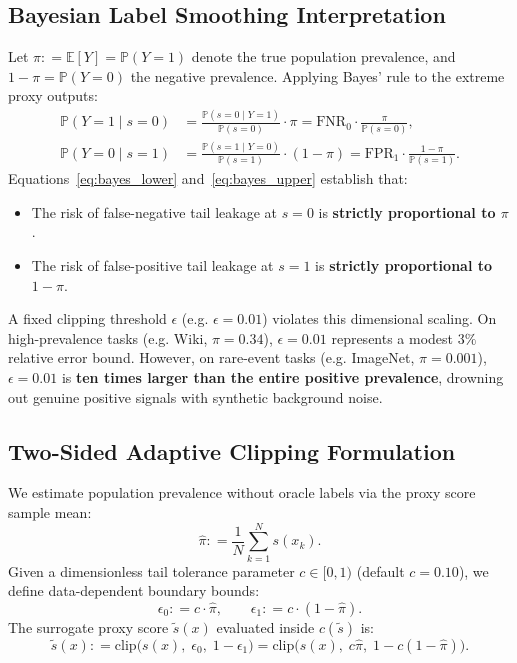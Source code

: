 \documentclass[11pt,a4paper]{article}
\newcommand{\coloneqq}{\mathrel{\mathop:}=}
\newcommand{\E}{\mathbb{E}}
\begin{document}
\subsection{Bayesian Label Smoothing Interpretation}
Let $\pi \coloneqq \E[Y] = \mathbb{P}(Y=1)$ denote the true population prevalence, and $1 - \pi = \mathbb{P}(Y=0)$ the negative prevalence.
Applying Bayes' rule to the extreme proxy outputs:
\begin{align}
\mathbb{P}(Y=1 \mid s=0) &= \frac{\mathbb{P}(s=0 \mid Y=1)}{\mathbb{P}(s=0)} \cdot \pi = \text{FNR}_0 \cdot \frac{\pi}{\mathbb{P}(s=0)}, \label{eq:bayes_lower} \\
\mathbb{P}(Y=0 \mid s=1) &= \frac{\mathbb{P}(s=1 \mid Y=0)}{\mathbb{P}(s=1)} \cdot (1 - \pi) = \text{FPR}_1 \cdot \frac{1 - \pi}{\mathbb{P}(s=1)}. \label{eq:bayes_upper}
\end{align}
Equations~\eqref{eq:bayes_lower} and~\eqref{eq:bayes_upper} establish that:
\begin{itemize}[leftmargin=*]
    \item The risk of false-negative tail leakage at $s=0$ is \textbf{strictly proportional to $\pi$}.
    \item The risk of false-positive tail leakage at $s=1$ is \textbf{strictly proportional to $1 - \pi$}.
\end{itemize}

A fixed clipping threshold $\epsilon$ (e.g. $\epsilon = 0.01$) violates this dimensional scaling. On high-prevalence tasks (e.g. Wiki, $\pi = 0.34$), $\epsilon = 0.01$ represents a modest $3\%$ relative error bound. However, on rare-event tasks (e.g. ImageNet, $\pi = 0.001$), $\epsilon = 0.01$ is \textbf{ten times larger than the entire positive prevalence}, drowning out genuine positive signals with synthetic background noise.

\subsection{Two-Sided Adaptive Clipping Formulation}
We estimate population prevalence without oracle labels via the proxy score sample mean:
\begin{equation}
\hat{\pi} \coloneqq \frac{1}{N}\sum_{k=1}^N s(x_k).
\end{equation}
Given a dimensionless tail tolerance parameter $c \in [0, 1)$ (default $c = 0.10$), we define data-dependent boundary bounds:
\begin{equation}\label{eq:adaptive_bounds}
\epsilon_0 \coloneqq c \cdot \hat{\pi}, \qquad \epsilon_1 \coloneqq c \cdot (1 - \hat{\pi}).
\end{equation}
The surrogate proxy score $\tilde{s}(x)$ evaluated inside $c(\tilde{s})$ is:
\begin{equation}\label{eq:clipped_score}
\tilde{s}(x) \coloneqq \mathrm{clip}\big(s(x), \; \epsilon_0, \; 1 - \epsilon_1\big) = \mathrm{clip}\big(s(x), \; c\hat{\pi}, \; 1 - c(1 - \hat{\pi})\big).
\end{equation}
\end{document}
